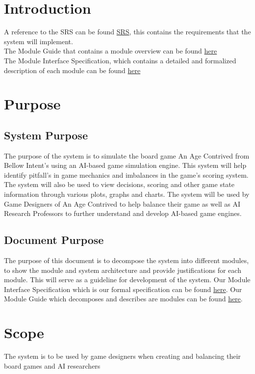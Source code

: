 \documentclass[12pt, titlepage]{article}
\begin{document}
\newpage

\tableofcontents
\listoftables
\listoffigures


\newpage


\section{Introduction}
A reference to the SRS can be found \href{https://github.com/Dorps/aiboardgame/blob/main/docs/SRS/SRS.pdf}{SRS}, this contains the requirements that the system will implement.\\
The Module Guide that contains a module overview can be found \href{https://github.com/Dorps/aiboardgame/tree/main/docs/Design/MG.pdf}{here} \\
The Module Interface Specification, which contains a detailed and formalized description of each module can be found \href{https://github.com/Dorps/aiboardgame/tree/main/docs/Design/MIS.pdf}{here}
\section{Purpose}
\subsection{System Purpose} The purpose of the system is to simulate the board game An Age Contrived from Bellow Intent's using an AI-based game simulation engine. This system will help identify pitfall's in game mechanics and imbalances in the game's scoring system. The system will also be used to view decisions, scoring and other game state information through various plots, graphs and charts.
The system will be used by Game Designers of An Age Contrived to help balance their game as well as AI Research Professors to further understand and develop AI-based game engines.
\subsection{Document Purpose}
The purpose of this document is to decompose the system into different modules, to show the module and system architecture and provide justifications for each module. This will serve as a guideline for development of the system. Our Module Interface Specification which is our formal specification can be found \href{}{here}. Our Module Guide which decomposes and describes are modules can be found \href{}{here}.

\section{Scope}
The system is to be used by game designers when creating and balancing their board games and AI researchers 
\end{document}
